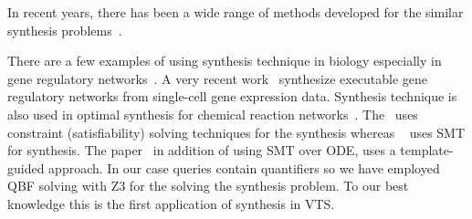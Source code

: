 In recent years, there has been a wide range of methods
developed for the similar synthesis problems~\cite{sktech,ceSynth,exampleSynth}.

There are a few examples of using synthesis technique in biology especially in gene regulatory networks~\cite{shavit2016automated, fisher2015synthesising}. A very recent work~\cite{fisher2015synthesising} synthesize executable gene regulatory networks from single-cell gene expression data. 
Synthesis technique is also used in optimal synthesis for chemical reaction networks~\cite{cardelli2017syntax}. The~\cite{fisher2015synthesising} uses constraint (satisfiability) solving techniques for the synthesis whereas ~\cite{shavit2016automated} uses SMT for synthesis. The paper~\cite{cardelli2017syntax} in addition of using SMT over ODE, uses a template-guided approach. In our case queries contain quantifiers so we have employed QBF solving with Z3 for the solving the synthesis problem. To our best knowledge this is the first application of synthesis in VTS.
